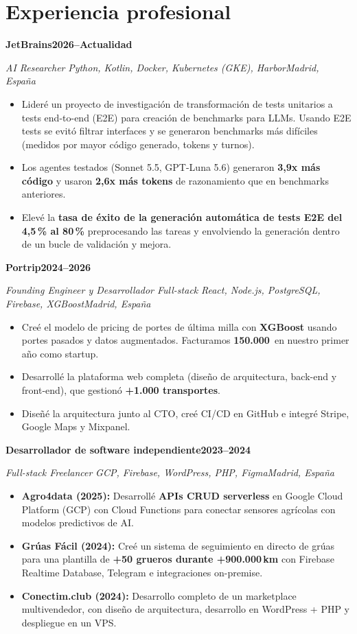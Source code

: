 \documentclass[10pt,letterpaper]{article}
\newenvironment{cvblock}{%
  \begin{list}{}{%
    \setlength{\leftmargin}{10.8pt}%
    \setlength{\rightmargin}{5.4pt}%
    \setlength{\topsep}{0pt}%
    \setlength{\partopsep}{0pt}%
    \setlength{\parsep}{0pt}%
    \setlength{\itemsep}{0pt}%
  }\item[]%
}{\end{list}}
\newcommand{\cvrole}[5]{%
  {\fontsize{11}{13}\selectfont\textbf{#1}\hfill\textbf{#2}\par}%
  \textit{#3}\,\textbar\,\textit{#4}\hfill\textit{#5}\par
}
\newenvironment{cvbullets}{%
  \begin{itemize}[leftmargin=24pt,label=\textbullet,
    labelsep=5pt,itemsep=1pt,topsep=1pt,parsep=0pt,partopsep=0pt]%
}{\end{itemize}}
\newcommand{\cvspace}{\vspace{2pt}}
\begin{document}
\section{Experiencia profesional}
\begin{cvblock}
  \cvrole{JetBrains}{2026--Actualidad}{AI Researcher}
    {Python, Kotlin, Docker, Kubernetes (GKE), Harbor}{Madrid, España}
  \begin{cvbullets}
    \item Lideré un proyecto de investigación de transformación de tests unitarios a tests end-to-end (E2E) para creación de benchmarks para LLMs. Usando E2E tests se evitó filtrar interfaces y se generaron benchmarks más difíciles (medidos por mayor código generado, tokens y turnos).
    \item Los agentes testados (Sonnet 5.5, GPT-Luna 5.6) generaron \textbf{3,9x más código} y usaron \textbf{2,6x más tokens} de razonamiento que en benchmarks anteriores.
    \item Elevé la \textbf{tasa de éxito de la generación automática de tests E2E del 4,5\,\% al 80\,\%} preprocesando las tareas y envolviendo la generación dentro de un bucle de validación y mejora.
  \end{cvbullets}
  \cvspace
  \cvrole{Portrip}{2024--2026}{Founding Engineer y Desarrollador Full-stack}
    {React, Node.js, PostgreSQL, Firebase, XGBoost}{Madrid, España}
  \begin{cvbullets}
    \item Creé el modelo de pricing de portes de última milla con \textbf{XGBoost} usando portes pasados y datos augmentados. Facturamos \textbf{150.000\,\texteuro{}} en nuestro primer año como startup.
    \item Desarrollé la plataforma web completa (diseño de arquitectura, back-end y front-end), que gestionó \textbf{+1.000 transportes}.
    \item Diseñé la arquitectura junto al CTO, creé CI/CD en GitHub e integré Stripe, Google Maps y Mixpanel.
  \end{cvbullets}
  \cvspace
  \cvrole{Desarrollador de software independiente}{2023--2024}{Full-stack Freelancer}
    {GCP, Firebase, WordPress, PHP, Figma}{Madrid, España}
  \begin{cvbullets}
    \item \textbf{Agro4data (2025):} Desarrollé \textbf{APIs CRUD serverless} en Google Cloud Platform (GCP) con Cloud Functions para conectar sensores agrícolas con modelos predictivos de AI.
    \item \textbf{Grúas Fácil (2024):} Creé un sistema de seguimiento en directo de grúas para una plantilla de \textbf{+50 grueros durante +900.000\,km} con Firebase Realtime Database, Telegram e integraciones on-premise.
    \item \textbf{Conectim.club (2024):} Desarrollo completo de un marketplace multivendedor, con diseño de arquitectura, desarrollo en WordPress + PHP y despliegue en un VPS.
  \end{cvbullets}
\end{cvblock}
\end{document}
